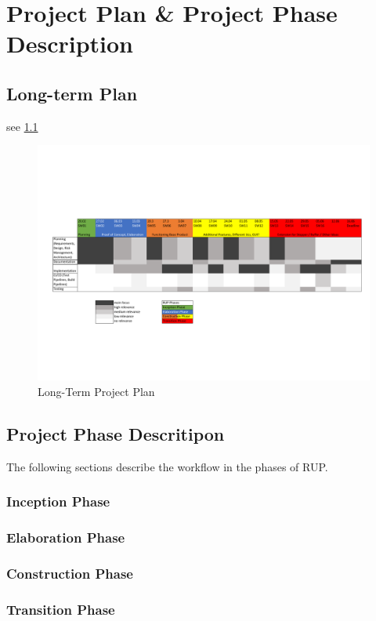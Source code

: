 \chapter{Project Plan \& Project Phase Description}

\section{Long-term Plan}

see \ref*{fig:longTermPlan}

    \begin{figure}[h!t]
        \centering
        \includegraphics[scale=0.80,angle=270]{resources/LongTermPlan.pdf}
        \caption{Long-Term Project Plan}
        \label{fig:longTermPlan}
    \end{figure}

\section{Project Phase Descritipon}
The following sections describe the workflow in the phases of RUP.
\subsection{Inception Phase}

\subsection{Elaboration Phase}

\subsection{Construction Phase}

\subsection{Transition Phase}

